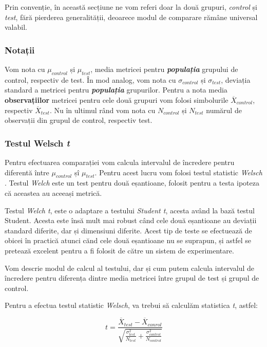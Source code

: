 Prin convenție, în această secțiune ne vom referi doar la două grupuri, \textit{control} și \textit{test}, fără pierderea generalității, deoarece modul de comparare rămâne universal valabil.

\subsubsection{Notații}

Vom nota cu  $\mu_{control}$ și $\mu_{test}$, media metricei pentru \textit{\textbf{populația}} grupului de control, respectiv de test. În mod analog, vom nota cu $\sigma_{control}$ și $\sigma_{test}$, deviația standard a metricei pentru \textit{\textbf{populația}} grupurilor. Pentru a nota media \textbf{observațiilor} metricei pentru cele două grupuri vom folosi simbolurile $\overline{X}_{control}$, respectiv $\overline{X}_{test}$. Nu în ultimul rând vom nota cu $N_{control}$ și $N_{test}$ numărul de observații din grupul de control, respectiv test.

\subsubsection{Testul Welsch \textit{t}}

Pentru efectuarea comparației vom calcula intervalul de încredere pentru diferentă între $\mu_{control}$ șî $\mu_{test}$. Pentru acest lucru vom folosi testul statistic \textit{Welsch} \cite{Welch1947}. Testul \textit{Welch} este un test pentru două eșantioane, folosit pentru a testa ipoteza că aceastea au aceeași metrică. 

Testul \textit{Welch t}, este o adaptare a testului \textit{Student t}, acesta având la bază testul Student. Acesta este însă mult mai robust când cele două eșantioane au deviații standard diferite, dar și dimensiuni diferite. Acest tip de teste se efectuează de obicei în practică atunci cănd cele două eșantioane nu se suprapun, și astfel se pretează excelent pentru a fi folosit de către un sistem de experimentare. 

Vom descrie modul de calcul al testului, dar și cum putem calcula intervalul de încredere pentru diferența dintre media metricei între grupul de test și grupul de control.

Pentru a efectua testul statistic \textit{Welsch}, va trebui să calculăm statistica \textit{t}, astfel:

\begin{equation}
\label{tstatistic}
	t = \frac{\overline{X}_{test} - \overline{X}_{conrol}}{
		\sqrt{ {\frac{\sigma_{test}^2}{N_{test}} }+ {\frac{\sigma_{control}^2}{N_{control}}}}
		}
\end{equation}


